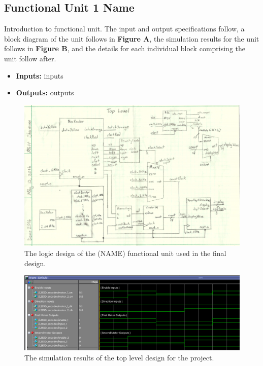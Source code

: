 \documentclass[a4paper]{article}
\begin{document}
\clearpage



\subsection{Functional Unit 1 Name}
Introduction to functional unit. The input and output specifications follow, a block diagram of the unit follows in \textbf{Figure A}, the simulation results for the unit follows in \textbf{Figure B}, and the details for each individual block comprising the unit follow after.
\begin{itemize}
  \item \textbf{Inputs:  } inputs
  \item \textbf{Outputs: } outputs
\end{itemize}
\begin{figure}[h]
  \centering
    \includegraphics[width=.8\textwidth]{images/functional_1.png}
	\caption{The logic design of the (NAME) functional unit used in the final design.}
    \label{fig:functional-1}
\end{figure}
\begin{figure}[h]
  \centering
    \includegraphics[width=.98\textwidth]{sims/functional_1.png}
	\caption{The simulation results of the top level design for the project.}
    \label{fig:top-level-sim}
\end{figure}
\end{document}
